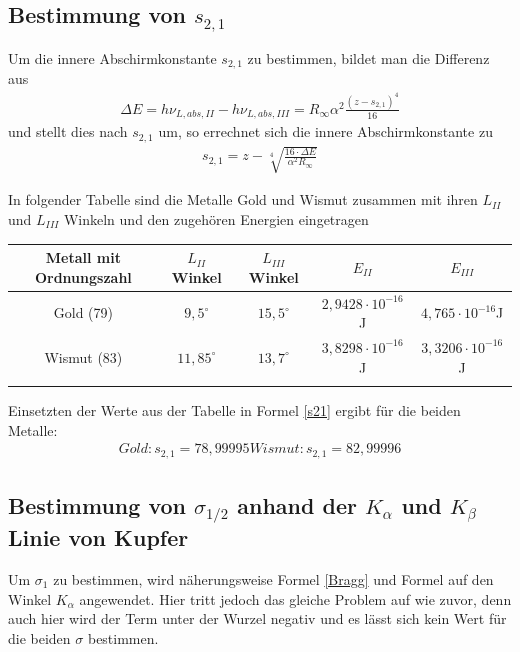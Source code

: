 \subsection{Bestimmung von $s_{2,1}$}
Um die innere Abschirmkonstante $s_{2,1}$ zu bestimmen, bildet man die Differenz aus %
\begin{align}
\Delta E = h\nu_{L,abs,II}-h\nu_{L,abs,III} = R_\infty\alpha^2\frac{(z-s_{2,1})^4}{16}
\end{align}
und stellt dies nach $s_{2,1}$ um, so errechnet sich die innere Abschirmkonstante zu
\begin{align}
s_{2,1} = z-\sqrt[4]{\frac{16\cdot\Delta E}{\alpha^2 R_\infty}}
\label{s21}
\end{align}

In folgender Tabelle sind die Metalle Gold und Wismut zusammen mit ihren $L_{II}$ und $L_{III}$ Winkeln und den zugehören Energien eingetragen\\

\begin{tabular}{|c|c|c|c|c|}
\hline 
Metall mit Ordnungszahl & $L_{II}$ Winkel & $L_{III}$ Winkel & $E_{II}$ & $E_{III}$ \\ 
\hline 
Gold (79) & $9,5^\circ$ & $15,5^\circ$ & $2,9428\cdot10^{-16}$J & $4,765\cdot10^{-16}$J \\ 
\hline 
Wismut (83) & $11,85^\circ$ & $13,7^\circ$ & $3,8298\cdot10^{-16}$J & $3,3206\cdot10^{-16}$J \\ 
\hline
\label{tab_s21}

\end{tabular} 

Einsetzten der Werte aus der Tabelle in Formel \ref{s21} ergibt für die beiden Metalle:
\begin{align*}
Gold: s_{2,1}=78,99995
Wismut: s_{2,1}=82,99996
\end{align*}

\subsection{Bestimmung von $\sigma_{1/2}$ anhand der $K_\alpha$ und $K_\beta$ Linie von Kupfer}
Um $\sigma_1$ zu bestimmen, wird näherungsweise Formel \ref{Bragg} und Formel %
auf den Winkel $K_\alpha$ angewendet. Hier tritt jedoch das gleiche Problem auf wie zuvor, denn auch hier wird der Term unter der Wurzel negativ und es lässt sich kein Wert für die beiden $\sigma$ bestimmen.

